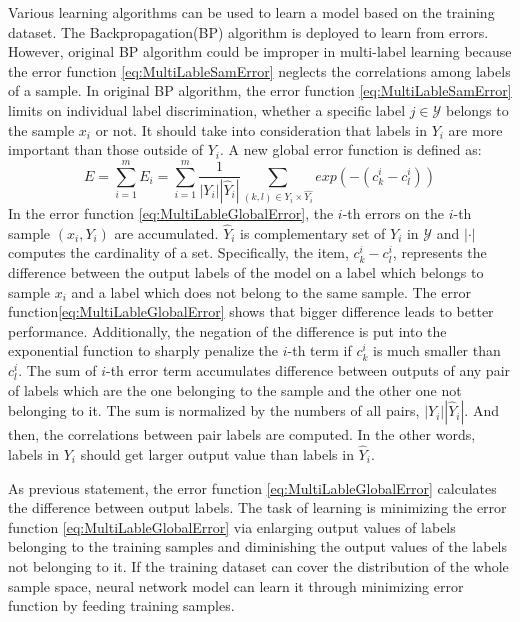 Various learning algorithms can be used to learn a model based on the training dataset. The Backpropagation(BP) algorithm is deployed to learn from errors. However, original BP algorithm could be improper in multi-label learning because the error function \ref{eq:MultiLableSamError} neglects the correlations among labels of a sample. In original BP algorithm, the error function \ref{eq:MultiLableSamError} limits on individual label discrimination, whether a specific label $j \in \mathcal{Y}$ belongs to the sample $x_{i}$ or not. It should take into consideration that labels in $Y_{i}$ are more important than those outside of $Y_{i}$. A new global error function is defined as:
\begin{equation}\label{eq:MultiLableGlobalError}
E = \sum_{i=1}^m E_{i} = \sum_{i=1}^m \frac{1}{|Y_{i}||\hat{Y}_{i}|} \sum_{(k,l) \in Y_{i} \times \hat{Y_{i}}} exp(-(c_{k}^i-c_{l}^i))
\end{equation}
In the error function \ref{eq:MultiLableGlobalError}, the $i$-th errors on the $i$-th sample $(x_{i},Y_{i})$ are accumulated. $\hat{Y}_{i}$ is complementary set of $Y_{i}$ in $\mathcal{Y}$ and $|\cdot|$ computes the cardinality of a set. Specifically, the item, $c_{k}^i-c_{l}^i$, represents the difference between the output labels of the model on a label which belongs to sample $x_{i}$ and a label which does not belong to the same sample. The error function\ref{eq:MultiLableGlobalError} shows that bigger difference leads to better performance. Additionally, the negation of the difference is put into the exponential function to sharply penalize the $i$-th term if $c_{k}^i$ is much smaller than $c_{l}^i$. The sum of $i$-th error term accumulates difference between outputs of any pair of labels which are the one belonging to the sample and the other one not belonging to it. The sum is normalized by the numbers of all pairs, $|Y_{i}||\hat{Y}_{i}|$. And then, the correlations between pair labels are computed. In the other words, labels in $Y_{i}$ should get larger output value than labels in $\hat{Y}_{i}$.

As previous statement, the error function \ref{eq:MultiLableGlobalError} calculates the difference between output labels. The task of learning is minimizing the error function \ref{eq:MultiLableGlobalError} via enlarging output values of labels belonging to the training samples and diminishing the output values of the labels not belonging to it. If the training dataset can cover the distribution of the whole sample space, neural network model can learn it through minimizing error function by feeding training samples.

